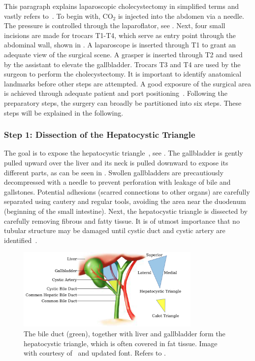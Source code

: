 This paragraph explains laparoscopic cholecystectomy in simplified terms and vastly refers to~\cite{ALES5766}. To begin with, $\text{CO}_2$ is injected into the abdomen via a needle. The pressure is controlled through the laparoflator, see . Next, four small incisions are made for trocars T1-T4, which serve as entry point through the abdominal wall, shown in . A laparoscope is inserted through T1 to grant an adequate view of the surgical scene. A grasper is inserted through T2 and used by the assistant to elevate the gallbladder. Trocars T3 and T4 are used by the surgeon to perform the cholecystectomy. It is important to identify anatomical landmarks before other steps are attempted. A good exposure of the surgical area is achieved through adequate patient and port positioning~\cite{gupta2023achieve}. Following the preparatory steps, the surgery can broadly be partitioned into six steps. These steps will be explained in the following.

\subsubsection{Step 1: Dissection of the Hepatocystic Triangle}
The goal is to expose the hepatocystic triangle~\cite{mischinger2020critical}, see . The gallbladder is gently pulled upward over the liver and its neck is pulled downward to expose its different parts, as can be seen in . Swollen gallbladders are precautiously decompressed with a needle to prevent perforation with leakage of bile and gallstones. Potential adhesions (scarred connections to other organs) are carefully separated using cautery and regular tools, avoiding the area near the duodenum (beginning of the small intestine). Next, the hepatocystic triangle is dissected by carefully removing fibrous and fatty tissue. It is of utmost importance that no tubular structure may be damaged until cystic duct and cystic artery are identified~\cite{mischinger2020critical}.
\begin{figure}[tb]
    \centering
    \includegraphics[width=0.8\textwidth]{introduction/fig/24_02_03_hepatocystic_triangle.jpg}
    \caption{The bile duct (green), together with liver and gallbladder form the hepatocystic triangle, which is often covered in fat tissue. Image with courtesy of~\cite{mischinger2020critical} and updated font. Refers to .}
    \label{in:fig:hepatocystic_triangle}
\end{figure}

